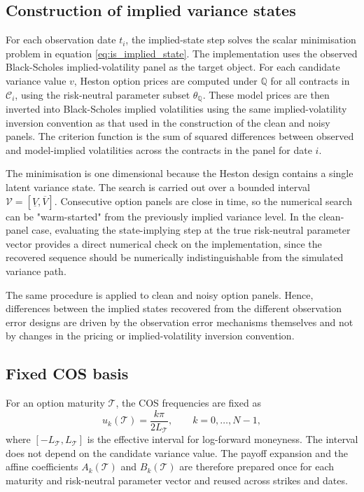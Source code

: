 \documentclass[11pt,a4paper,notitlepage]{article}
\numberwithin{equation}{section}
\begin{document}
\subsection{Construction of implied variance states}

For each observation date \(t_i\), the implied-state step solves the scalar minimisation problem in equation \eqref{eq:is_implied_state}. The implementation uses the observed Black-Scholes implied-volatility panel as the target object. For each candidate variance value \(v\), Heston option prices are computed under \(\mathbb Q\) for all contracts in \(\mathcal C_i\), using the risk-neutral parameter subset \(\theta_{\mathbb Q}\). These model prices are then inverted into Black-Scholes implied volatilities using the same implied-volatility inversion convention as that used in the construction of the clean and noisy panels. The criterion function is the sum of squared differences between observed and model-implied volatilities across the contracts in the panel for date \(i\).

The minimisation is one dimensional because the Heston design contains a single latent variance state. The search is carried out over a bounded interval \(\mathcal V=[\underline V,\overline V]\). Consecutive option panels are close in time, so the numerical search can be "warm-started" from the previously implied variance level. In the clean-panel case, evaluating the state-implying step at the true risk-neutral parameter vector provides a direct numerical check on the implementation, since the recovered sequence should be numerically indistinguishable from the simulated variance path.

The same procedure is applied to clean and noisy option panels. Hence, differences between the implied states recovered from the different observation error designs are driven by the observation error mechanisms themselves and not by changes in the pricing or implied-volatility inversion convention.

\subsection{Fixed COS basis}

For an option maturity \(\mathcal T\), the COS frequencies are fixed as
\begin{equation}
u_k(\mathcal T)
=
\frac{k\pi}{2L_{\mathcal T}},
\qquad k=0,\ldots,N-1,
\label{eq:app_fixed_cos_grid}
\end{equation}
where \([-L_{\mathcal T},L_{\mathcal T}]\) is the effective interval for log-forward moneyness. The interval does not depend on the candidate variance value. The payoff expansion and the affine coefficients \(A_k(\mathcal T)\) and \(B_k(\mathcal T)\) are therefore prepared once for each maturity and risk-neutral parameter vector and reused across strikes and dates.
\end{document}
